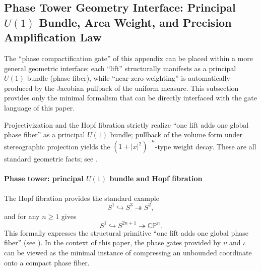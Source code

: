 \subsection{Phase Tower Geometry Interface: Principal \texorpdfstring{$U(1)$}{U(1)} Bundle, Area Weight, and Precision Amplification Law}\label{subsec:unit-disk-phase-tower}
The ``phase compactification gate'' of this appendix can be placed within a more general geometric interface: each ``lift'' structurally manifests as a principal \(U(1)\) bundle (phase fiber), while ``near-zero weighting'' is automatically produced by the Jacobian pullback of the uniform measure.
This subsection provides only the minimal formalism that can be directly interfaced with the gate language of this paper.

\begin{remark}\label{rem:phase-tower-standard-chain}
Projectivization and the Hopf fibration strictly realize ``one lift adds one global phase fiber'' as a principal \(U(1)\) bundle; pullback of the volume form under stereographic projection yields the \((1+|x|^{2})^{-n}\)-type weight decay. These are all standard geometric facts; see \cite{Husemoller1994FiberBundles}.
\end{remark}

\paragraph{Phase tower: principal \texorpdfstring{$U(1)$}{U(1)} bundle and Hopf fibration}
The Hopf fibration provides the standard example
\[
S^{1}\hookrightarrow S^{3}\twoheadrightarrow S^{2},
\]
and for any \(n\ge 1\) gives
\[
S^{1}\hookrightarrow S^{2n+1}\twoheadrightarrow \mathbb{CP}^{n}.
\]
This formally expresses the structural primitive ``one lift adds one global phase fiber'' (see \cite{Husemoller1994FiberBundles}).
In the context of this paper, the phase gates provided by \(\upsilon\) and \(\iota\) can be viewed as the minimal instance of compressing an unbounded coordinate onto a compact phase fiber.

